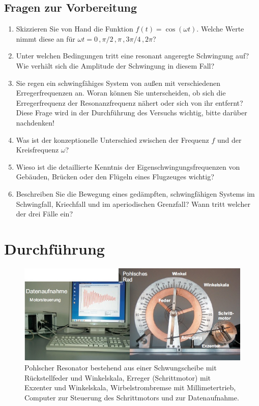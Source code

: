 \begin{tutorhint}
\section{Fragen zur Vorbereitung}

\begin{enumerate} 
	\item Skizzieren Sie von Hand die Funktion $f(t) = \cos(\omega t)$. Welche Werte nimmt diese an für $\omega t = 0\, , \pi/2\, , \pi\, , 3\pi/4\, , 2\pi$?
	\item Unter welchen Bedingungen tritt eine resonant angeregte Schwingung auf? Wie verhält sich die Amplitude der Schwingung in diesem Fall?
	\item Sie regen ein schwingfähiges System von außen mit verschiedenen Erregerfrequenzen an. Woran können Sie unterscheiden, ob sich die Erregerfrequenz der Resonanzfrequenz nähert oder sich von ihr entfernt? Diese Frage wird in der Durchführung des Versuchs wichtig, bitte darüber nachdenken!
	\item Was ist der konzeptionelle Unterschied zwischen der Frequenz $f$ und der Kreisfrequenz $\omega$?
	\item Wieso ist die detaillierte Kenntnis der Eigenschwingungsfrequenzen von Gebäuden, Brücken oder den Flügeln eines Flugzeuges wichtig?
	\item Beschreiben Sie die Bewegung eines gedämpften, schwingfähigen Systems im Schwingfall, Kriechfall und im aperiodischen Grenzfall? Wann tritt welcher der drei Fälle ein?
\end{enumerate} 
\end{tutorhint}
\section{Durchführung} 

\begin{figure}[t]
	\centering
		\includegraphics[width=\textwidth]{Abbildungen/Pohl_AP.jpg}
	\caption{Pohlscher Resonator bestehend aus einer Schwungscheibe mit Rückstellfeder und Winkelskala, Erreger (Schrittmotor) mit Exzenter und Winkelskala, Wirbelstrombremse mit Millimetertrieb, Computer zur Steuerung des Schrittmotors und zur Datenaufnahme.}
	\label{fig:Pohl_AP}
\end{figure}


